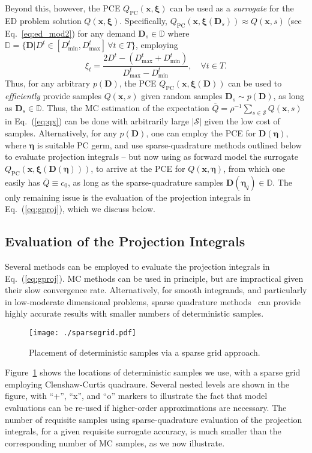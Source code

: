 \documentclass[conference]{IEEEtran}
\newcommand{\be}{\begin{equation}}
\newcommand{\ee}{\end{equation}}
\newcommand{\etavec}{{\boldsymbol \eta}}
\newcommand{\xivec}{{\boldsymbol{\xi}}}
\begin{document}
Beyond this, however, the PCE $Q_\mathrm{PC}(\boldsymbol x, \xivec)$ can be used as a
\emph{surrogate} for the ED problem solution $Q(\bm{x},\xivec)$. Specifically,
$Q_\mathrm{PC}(\bm{x},\xivec(\bm{D}_s)) \approx Q(\boldsymbol x, s)$ (see Eq.~\ref{eq:ed_mod2})
for any demand $\boldsymbol D_s\in \mathbb{D}$ where $\mathbb{D}=\{\boldsymbol D |
D^t\in[D^t_{\mathrm{min}},D^t_{\mathrm{max}}] \, \forall t\in T\}$, employing 
\be
\xi_t = \frac{2 D^t - (D^t_{\mathrm{max}}+D^t_{\mathrm{min}})
}{D^t_{\mathrm{max}}-D^t_{\mathrm{min}} }, \quad \forall t\in T.
\label{eq:D2xi}
\ee
Thus, for any arbitrary $p(\boldsymbol D)$, the PCE $Q_\mathrm{PC}(\boldsymbol
x,\xivec(\boldsymbol D))$ can be used to \emph{efficiently} provide samples
$Q(\boldsymbol x,s)$ given random samples ${\boldsymbol D}_{s}\sim p(\boldsymbol
D)$, as long as ${\boldsymbol D}_s\in \mathbb{D}$.  Thus, the MC estimation of
the expectation $\overline Q = \rho^{-1}\sum_{s\in\mathcal S} Q(\boldsymbol x,
s)$ in Eq.~(\ref{eq:qx}) can be done with arbitrarily large $|\mathcal S|$ given
the low cost of samples. Alternatively, for any $p(\boldsymbol D)$, one can
employ the PCE for $\boldsymbol D(\etavec)$, where $\etavec$ is suitable PC
germ, and use sparse-quadrature methods outlined below to evaluate projection
integrals -- but now using as forward model the surrogate
$Q_\mathrm{PC}(\boldsymbol x, \xivec ( \boldsymbol D(\etavec)))$, to arrive at
the PCE for $Q(\boldsymbol x, \etavec)$, from which one easily has $\overline Q
\equiv c_0$, as long as the sparse-quadrature samples $\boldsymbol D(\etavec_q)
\in \mathbb{D}$.  The only remaining issue is the evaluation of the projection
integrals in Eq.~(\ref{eq:gproj}), which we discuss below.

\subsection{Evaluation of the Projection Integrals}

Several methods can be employed to evaluate the projection integrals in
Eq.~(\ref{eq:gproj}). MC methods can be used in principle, but are impractical
given their slow convergence rate. Alternatively, for smooth
integrands, and particularly in low-moderate dimensional problems, sparse
quadrature methods~\cite{Smolyak:1963,Gerstner:1998,Conrad:2013} can provide
highly accurate results with smaller numbers of deterministic samples.
\begin{figure}[t]
\centering
\texttt{[image: ./sparsegrid.pdf]}
\caption{\label{fig:sgr} Placement of deterministic samples via a
  sparse grid approach. }
\end{figure}
Figure~\ref{fig:sgr} shows the locations of deterministic samples we use, with a
sparse grid employing Clenshaw-Curtis quadraure. Several nested levels are shown
in the figure, with ``+'', ``x'', and ``o'' markers to illustrate the fact that
model evaluations can be re-used if higher-order approximations are necessary.
The number of requisite samples using sparse-quadrature evaluation of the
projection integrals, for a given requisite surrogate accuracy, is much smaller
than the corresponding number of MC samples, as we now illustrate.
\end{document}
